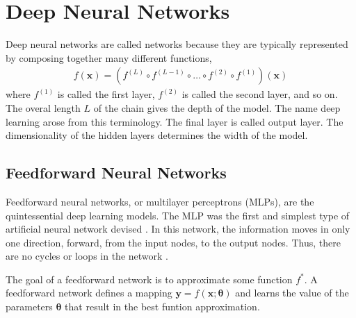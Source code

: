 \documentclass{scrartcl}
\begin{document}


\newpage


\section{Deep Neural Networks}


Deep neural networks are called networks because they are typically represented by composing together many different functions, 
\begin{align}
f(\mathbf x) = (f^{(L)} \circ f^{(L-1)} \circ \dots \circ f^{(2)} \circ f^{(1)})(\mathbf x)
\end{align} 
where $f^{(1)}$ is called the first layer, $f^{(2)}$ is called the second layer, and so on. The overal length $L$ of the chain gives the depth of the model. The name deep learning arose from this terminology. The final layer is called output layer. The dimensionality of the hidden layers determines the width of the model. 

\subsection{Feedforward Neural Networks}

Feedforward neural networks, or multilayer perceptrons (MLPs), are the quintessential deep learning models. The MLP was the first and simplest type of artificial neural network devised \cite{Schmidhuber2015}. In this network, the information moves in only one direction, forward, from the input nodes, to the output nodes. Thus, there are no cycles or loops in the network \cite{Zell1994}.

The goal of a feedforward network is to approximate some function $f^*$. A feedforward network defines a mapping $\mathbf y = f(\mathbf x; \boldsymbol \theta)$ and learns the value of the parameters $\boldsymbol \theta$ that result in the best funtion approximation. 
\end{document}

